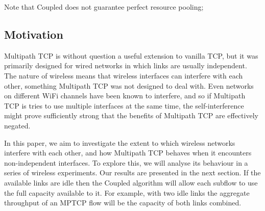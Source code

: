 Note that Coupled does not guarantee perfect resource pooling;

\subsection{Motivation}
\label{sec:bg:motivation}
Multipath TCP is without question a useful extension to vanilla TCP, but it was
primarily designed for wired networks in which links are usually independent.
The nature of wireless means that wireless interfaces can interfere with each
other, something Multipath TCP was not designed to deal with. Even networks on
different WiFi channels have been known to interfere, and so if Multipath TCP is
tries to use multiple interfaces at the same time, the self-interference might
prove sufficiently strong that the benefits of Multipath TCP are effectively
negated.

In this paper, we aim to investigate the extent to which wireless networks
interfere with each other, and how Multipath TCP behaves when it encounters
non-independent interfaces. To explore this, we will analyse its behaviour in a
series of wireless experiments. Our results are presented in the next section.
If the available links are idle then the Coupled algorithm will allow each
subflow to use the full capacity available to it. For example, with two idle
links the aggregate throughput of an MPTCP flow will be the capacity of both
links combined.
